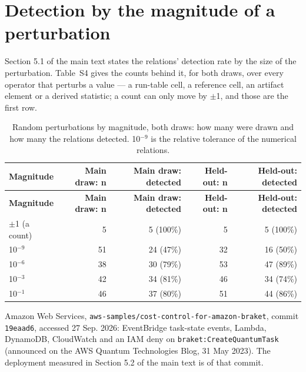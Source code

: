 \documentclass[acmsmall,screen,review]{acmart}
\begin{document}
\section{Detection by the magnitude of a perturbation}

Section 5.1 of the main text states the relations' detection rate by the size of the perturbation. Table~S4 gives the counts behind it, for both draws, over every operator that perturbs a value --- a run-table cell, a reference cell, an artifact element or a derived statistic; a count can only move by $\pm$1, and those are the first row.



\begingroup
\small
\setlength\LTleft{\fill}
\setlength\LTright{\fill}
\begin{xltabular}{\textwidth}{Yrrrr}
\caption{Random perturbations by magnitude, both draws: how many were drawn and how many the relations detected. 10$^{-9}$ is the relative tolerance of the numerical relations.}\label{tab:4} \\
\toprule
\textbf{Magnitude} & \textbf{Main draw: n} & \textbf{Main draw: detected} & \textbf{Held-out: n} & \textbf{Held-out: detected} \\
\midrule
\endfirsthead
\toprule
\textbf{Magnitude} & \textbf{Main draw: n} & \textbf{Main draw: detected} & \textbf{Held-out: n} & \textbf{Held-out: detected} \\
\midrule
\endhead
\endfoot
\bottomrule
\endlastfoot
$\pm$1 (a count) & 5 & 5 (100\%) & 5 & 5 (100\%) \\*
10$^{-9}$ & 51 & 24 (47\%) & 32 & 16 (50\%) \\*
10$^{-6}$ & 38 & 30 (79\%) & 53 & 47 (89\%) \\*
10$^{-3}$ & 42 & 34 (81\%) & 46 & 34 (74\%) \\*
10$^{-1}$ & 46 & 37 (80\%) & 51 & 44 (86\%) \\
\end{xltabular}
\endgroup


\begin{thebibliography}{99}
 Amazon Web Services, \texttt{aws-\allowbreak{}samples/\allowbreak{}cost-\allowbreak{}control-\allowbreak{}for-\allowbreak{}amazon-\allowbreak{}braket}, commit \texttt{19eaad6}, accessed 27 Sep. 2026: EventBridge task-state events, Lambda, DynamoDB, CloudWatch and an IAM deny on \texttt{braket:\allowbreak{}Create\allowbreak{}Quantum\allowbreak{}Task} (announced on the AWS Quantum Technologies Blog, 31 May 2023). The deployment measured in Section 5.2 of the main text is of that commit.
\end{thebibliography}
\end{document}
